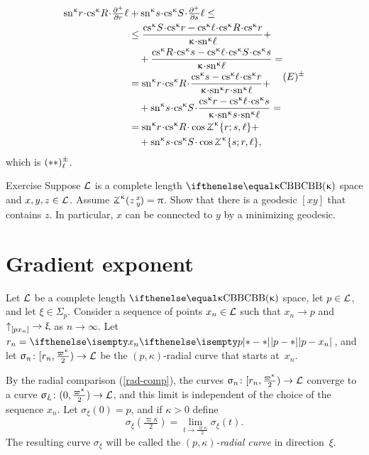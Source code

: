 \[\begin{aligned}
\sn\kappa r\cdot\cs\kappa R\cdot\tfrac{\partial^+}{\partial r}\ell
&+
\sn\kappa s\cdot\cs\kappa S\cdot\tfrac{\partial^+}{\partial s}\ell\le
\\
&\le
\frac
{{\cs\kappa S}\cdot\cs\kappa r-\cs\kappa\ell\cdot\cs\kappa R\cdot\cs\kappa r}
{\kappa\cdot\sn\kappa\ell}
+\\
&\quad +
\frac
{{\cs\kappa R}\cdot\cs\kappa s-\cs\kappa\ell\cdot\cs\kappa S\cdot\cs\kappa s}
{\kappa\cdot\sn\kappa\ell}=
\\
&=
\sn\kappa r\cdot\cs\kappa R\cdot
\frac
{\cs\kappa s-\cs\kappa\ell\cdot\cs\kappa r}
{\kappa\cdot\sn\kappa r\cdot\sn\kappa\ell}
+\\
&\quad +
\sn\kappa s\cdot\cs\kappa S\cdot
\frac
{\cs\kappa r-\cs\kappa\ell\cdot\cs\kappa s}
{\kappa\cdot\sn\kappa s\cdot\sn\kappa\ell}
=
\\
&=\sn\kappa r\cdot\cs\kappa R\cdot\cos\tangle\mc\kappa\{r;s,\ell\}
+\\
&\quad +\sn\kappa s\cdot\cs\kappa S\cdot\cos\tangle\mc\kappa\{s;r,\ell\},
\end{aligned}
\leqno(E)\mc\pm\]
which is $(**)^{\pm}_\ell$.\qeds


\begin{thm}{Exercise}\label{ex:geodesic}
Suppose $\mathcal{L}$ is a complete length $\Alex\kappa$ space 
and $x,y,z\in \spc{L}$.
Assume $\angk\kappa zxy=\pi$.
Show that there is a geodesic $[xy]$
that contains $z$.
In particular, $x$ can be connected to $y$ by a minimizing geodesic.
\end{thm}





\section{Gradient exponent}\label{sec:gexp}

Let $\mathcal{L}$ be a complete length $\Alex{\kappa}$ space, 
let $p\in \spc{L}$, 
and let $\xi\in \Sigma_p$.
Consider a sequence of points $x_n\in \spc{L}$ such that $x_n\to p$ and $\dir p{x_n}\to \xi$ as $n\to\infty$.
Let $r_n=\dist{p}{x_n}{}$, and let
$\sigma_n\:[r_n,\tfrac{\varpi\kappa}2)\to \spc{L}$ be the $(p,\kappa)$-radial curve that starts at~$x_n$.

By the radial comparison (\ref{rad-comp}), 
the curves $\sigma_n\:[r_n,\tfrac{\varpi\kappa}2)\to \spc{L}$ 
converge to a curve $\sigma_\xi\:(0,\tfrac{\varpi\kappa}2)\to \spc{L}$, 
and this limit is independent of the choice of the sequence $x_n$.
Let $\sigma_\xi(0)=p$, and if $\kappa>0$ define \[\sigma_\xi(\tfrac{\varpi\kappa}2)
=
\lim_{t\to\frac{\varpi\kappa}2}\sigma_\xi(t).\]
The resulting curve $\sigma_\xi$ will be called the \emph{$(p,\kappa)$-radial curve} in direction~$\xi$.

